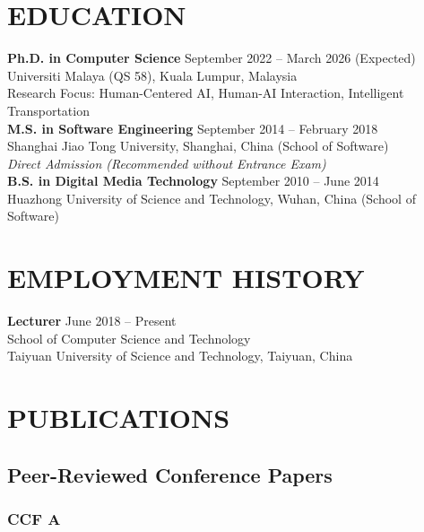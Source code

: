 \documentclass[a4paper,9pt]{extarticle}
\begin{document}
\section*{EDUCATION}

\noindent
\textbf{Ph.D. in Computer Science} \hfill September 2022 -- March 2026 (Expected) \\
Universiti Malaya (QS 58), Kuala Lumpur, Malaysia \\
Research Focus: Human-Centered AI, Human-AI Interaction, Intelligent Transportation \\

\noindent
\textbf{M.S. in Software Engineering} \hfill September 2014 -- February 2018 \\
Shanghai Jiao Tong University, Shanghai, China (School of Software) \\
\textit{Direct Admission (Recommended without Entrance Exam)} \\

\noindent
\textbf{B.S. in Digital Media Technology} \hfill September 2010 -- June 2014 \\
Huazhong University of Science and Technology, Wuhan, China (School of Software)

\section*{EMPLOYMENT HISTORY}

\noindent
\textbf{Lecturer} \hfill June 2018 -- Present \\
School of Computer Science and Technology \\
Taiyuan University of Science and Technology, Taiyuan, China

\section*{PUBLICATIONS\footnotemark[1]}

\subsection*{Peer-Reviewed Conference Papers}

\subsubsection*{CCF A}
\end{document}
